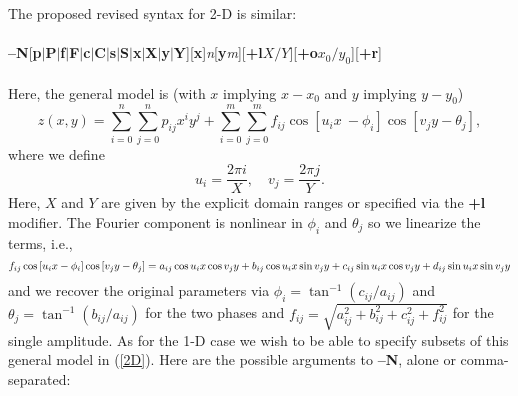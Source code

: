 \documentclass[12pt,letterpaper,margin=0.5in]{report}
\begin{document}
The proposed revised syntax for 2-D is similar:
\\ \\
{\bf --N}[{\bf p}$|${\bf P}$|${\bf f}$|${\bf F}$|${\bf c}$|${\bf C}$|${\bf s}$|${\bf S}$|${\bf x}$|${\bf X}$|${\bf y}$|${\bf Y}][{\bf x}]{\it n}[{\bf y}{\it m}][{\bf +l}$X/Y$][{\bf +o}$x_0/y_0$][{\bf +r}]
\\ \\
Here, the general model is (with $x$ implying $x - x_0$ and $y$ implying $y - y_0$)
\begin{equation}
z(x,y) = \sum_{i = 0}^n \sum_{j = 0}^n p_{ij} x^iy^j + \sum_{i = 0}^m \sum_{j = 0}^m f_{ij} \cos \left [u_i x \
	- \phi_i \right ] \cos \left [v_j y - \theta_j \right ],
\label{2D}
\end{equation}
where we define
\begin{equation}
	u_i = \frac{2 \pi i}{X}, \quad v_j = \frac{2 \pi j}{Y}.
\end{equation}
Here, $X$ and $Y$ are given by the explicit domain ranges or specified via the {\bf +l} modifier.
The Fourier component is nonlinear in $\phi_i$ and $\theta_j$ so we linearize the terms, i.e.,
\begin{dmath}
f_{ij} \cos \left [u_i x- \phi_i \right ] \cos \left [v_j y - \theta_j \right ] =
a_{ij} \cos u_i x \cos v_j y + b_{ij} \cos u_i x \sin v_j y + \\
c_{ij} \sin u_i x \cos v_j y + d_{ij} \sin u_i x \sin v_j y
\end{dmath}
and we recover the original parameters via $\phi_i = \tan^{-1}(c_{ij}/a_{ij})$ and $\theta_j = \tan^{-1}(b_{ij}/a_{ij})$
for the two phases and $f_{ij} = \sqrt{a_{ij}^2 + b_{ij}^2 + c_{ij}^2 + f_{ij}^2}$ for the single amplitude.
As for the 1-D case
we wish to be able to specify subsets of this general model in (\ref{2D}).  Here are the possible arguments to {\bf --N}, alone or comma-separated:
\end{document}
